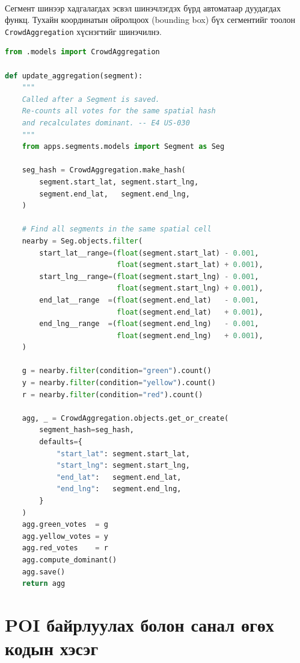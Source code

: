\paragraph{} Сегмент шинээр хадгалагдах эсвэл шинэчлэгдэх бүрд автоматаар дуудагдах функц. Тухайн координатын ойролцоох (bounding box) бүх сегментийг тоолон \texttt{CrowdAggregation} хүснэгтийг шинэчилнэ.
\begin{lstlisting}[language=Python]
from .models import CrowdAggregation

def update_aggregation(segment):
    """
    Called after a Segment is saved.
    Re-counts all votes for the same spatial hash
    and recalculates dominant. -- E4 US-030
    """
    from apps.segments.models import Segment as Seg

    seg_hash = CrowdAggregation.make_hash(
        segment.start_lat, segment.start_lng,
        segment.end_lat,   segment.end_lng,
    )

    # Find all segments in the same spatial cell
    nearby = Seg.objects.filter(
        start_lat__range=(float(segment.start_lat) - 0.001,
                          float(segment.start_lat) + 0.001),
        start_lng__range=(float(segment.start_lng) - 0.001,
                          float(segment.start_lng) + 0.001),
        end_lat__range  =(float(segment.end_lat)   - 0.001,
                          float(segment.end_lat)   + 0.001),
        end_lng__range  =(float(segment.end_lng)   - 0.001,
                          float(segment.end_lng)   + 0.001),
    )

    g = nearby.filter(condition="green").count()
    y = nearby.filter(condition="yellow").count()
    r = nearby.filter(condition="red").count()

    agg, _ = CrowdAggregation.objects.get_or_create(
        segment_hash=seg_hash,
        defaults={
            "start_lat": segment.start_lat,
            "start_lng": segment.start_lng,
            "end_lat":   segment.end_lat,
            "end_lng":   segment.end_lng,
        }
    )
    agg.green_votes  = g
    agg.yellow_votes = y
    agg.red_votes    = r
    agg.compute_dominant()
    agg.save()
    return agg
\end{lstlisting}

\section*{POI байрлуулах болон санал өгөх кодын хэсэг}
